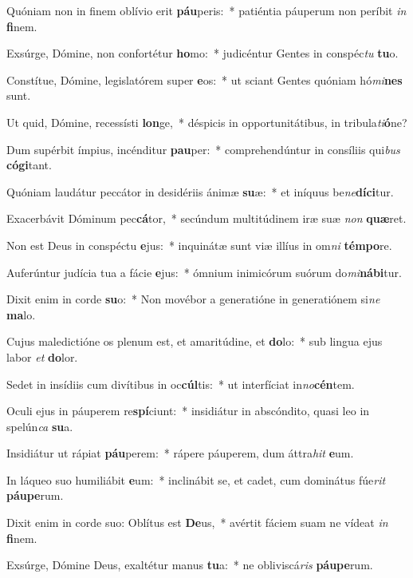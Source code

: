 \item Quóniam non in finem oblívio erit \textbf{páu}peris:~* patiéntia páuperum non períbit \textit{in} \textbf{fi}nem.
\item Exsúrge, Dómine, non confortétur \textbf{ho}mo:~* judicéntur Gentes in conspéc\textit{tu} \textbf{tu}o.
\item Constítue, Dómine, legislatórem super \textbf{e}os:~* ut sciant Gentes quóniam hó\textit{mi}\textbf{nes} sunt.
\item Ut quid, Dómine, recessísti \textbf{lon}ge,~* déspicis in opportunitátibus, in tribula\textit{ti}\textbf{ó}ne?
\item Dum supérbit ímpius, incénditur \textbf{pau}per:~* comprehendúntur in consíliis qui\textit{bus} \textbf{có}\textbf{gi}tant.
\item Quóniam laudátur peccátor in desidériis ánimæ \textbf{su}æ:~* et iníquus be\textit{ne}\textbf{dí}\textbf{ci}tur.
\item Exacerbávit Dóminum pec\textbf{cá}tor,~* secúndum multitúdinem iræ suæ \textit{non} \textbf{quæ}ret.
\item Non est Deus in conspéctu \textbf{e}jus:~* inquinátæ sunt viæ illíus in om\textit{ni} \textbf{tém}\textbf{po}re.
\item Auferúntur judícia tua a fácie \textbf{e}jus:~* ómnium inimicórum suórum do\textit{mi}\textbf{ná}\textbf{bi}tur.
\item Dixit enim in corde \textbf{su}o:~* Non movébor a generatióne in generatiónem si\textit{ne} \textbf{ma}lo.
\item Cujus maledictióne os plenum est, et amaritúdine, et \textbf{do}lo:~* sub lingua ejus labor \textit{et} \textbf{do}lor.
\item Sedet in insídiis cum divítibus in oc\textbf{cúl}tis:~* ut interfíciat in\textit{no}\textbf{cén}tem.
\item Oculi ejus in páuperem re\textbf{spí}ciunt:~* insidiátur in abscóndito, quasi leo in spelún\textit{ca} \textbf{su}a.
\item Insidiátur ut rápiat \textbf{páu}perem:~* rápere páuperem, dum áttra\textit{hit} \textbf{e}um.
\item In láqueo suo humiliábit \textbf{e}um:~* inclinábit se, et cadet, cum dominátus fúe\textit{rit} \textbf{páu}\textbf{pe}rum.
\item Dixit enim in corde suo: Oblítus est \textbf{De}us,~* avértit fáciem suam ne vídeat \textit{in} \textbf{fi}nem.
\item Exsúrge, Dómine Deus, exaltétur manus \textbf{tu}a:~* ne obliviscá\textit{ris} \textbf{páu}\textbf{pe}rum.
